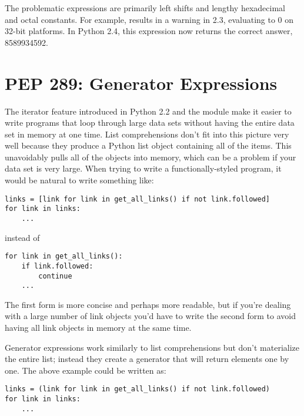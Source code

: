 \documentclass{howto}
\begin{document}
The problematic expressions are primarily left shifts and lengthy
hexadecimal and octal constants.  For example,
 results
in a warning in 2.3, evaluating to 0 on 32-bit platforms.  In Python
2.4, this expression now returns the correct answer, 8589934592.

\begin{seealso}
\end{seealso}


\section{PEP 289: Generator Expressions}

The iterator feature introduced in Python 2.2 and the
 module make it easier to write programs that loop
through large data sets without having the entire data set in memory
at one time.  List comprehensions don't fit into this picture very
well because they produce a Python list object containing all of the
items.  This unavoidably pulls all of the objects into memory, which
can be a problem if your data set is very large.  When trying to write
a functionally-styled program, it would be natural to write something
like:

\begin{verbatim}
links = [link for link in get_all_links() if not link.followed]
for link in links:
    ...
\end{verbatim}

instead of 

\begin{verbatim}
for link in get_all_links():
    if link.followed:
        continue
    ...
\end{verbatim}

The first form is more concise and perhaps more readable, but if
you're dealing with a large number of link objects you'd have to write
the second form to avoid having all link objects in memory at the same
time.

Generator expressions work similarly to list comprehensions but don't
materialize the entire list; instead they create a generator that will
return elements one by one.  The above example could be written as:

\begin{verbatim}
links = (link for link in get_all_links() if not link.followed)
for link in links:
    ...
\end{verbatim}
\end{document}
